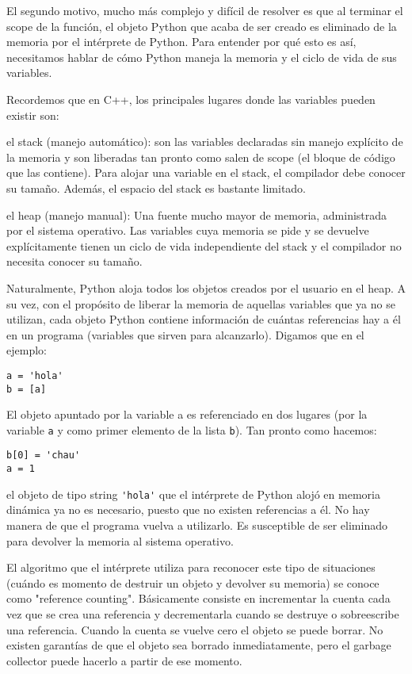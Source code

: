 \documentclass[]{article}
\begin{document}
El segundo motivo, mucho más complejo y difícil de resolver es que al terminar
el scope de la función, el objeto Python que acaba de ser creado es eliminado
de la memoria por el intérprete de Python. Para entender por qué esto es así,
necesitamos hablar de cómo Python maneja la memoria y el ciclo de vida de sus
variables.

Recordemos que en C++, los principales lugares donde las variables pueden
existir son:

el stack (manejo automático): son las variables declaradas sin manejo explícito
de la memoria y son liberadas tan pronto como salen de scope (el bloque de
código que las contiene). Para alojar una variable en el stack, el compilador
debe conocer su tamaño. Además, el espacio del stack es bastante limitado.

el heap (manejo manual): Una fuente mucho mayor de memoria, administrada por el
sistema operativo. Las variables cuya memoria se pide y se devuelve
explícitamente tienen un ciclo de vida independiente del stack y el compilador
no necesita conocer su tamaño.

Naturalmente, Python aloja todos los objetos creados por el usuario en el heap.
A su vez, con el propósito de liberar la memoria de aquellas variables que ya
no se utilizan, cada objeto Python contiene información de cuántas referencias
hay a él en un programa (variables que sirven para alcanzarlo). Digamos que en
el ejemplo:

\begin{verbatim}
a = 'hola'
b = [a]
\end{verbatim}

El objeto apuntado por la variable a es referenciado en dos lugares (por la
variable \verb!a! y como primer elemento de la lista \verb!b!). Tan pronto como
hacemos:

\begin{verbatim}
b[0] = 'chau'
a = 1
\end{verbatim}

el objeto de tipo string \verb!'hola'! que el intérprete de Python alojó en
memoria dinámica ya no es necesario, puesto que no existen referencias a él. No
hay manera de que el programa vuelva a utilizarlo. Es susceptible de ser
eliminado para devolver la memoria al sistema operativo.

El algoritmo que el intérprete utiliza para reconocer este tipo de situaciones
(cuándo es momento de destruir un objeto y devolver su memoria) se conoce como
"reference counting". Básicamente consiste en incrementar la cuenta cada vez
que se crea una referencia y decrementarla cuando se destruye o sobreescribe
una referencia. Cuando la cuenta se vuelve cero el objeto se puede borrar. No
existen garantías de que el objeto sea borrado inmediatamente, pero el garbage
collector puede hacerlo a partir de ese momento.
\end{document}
